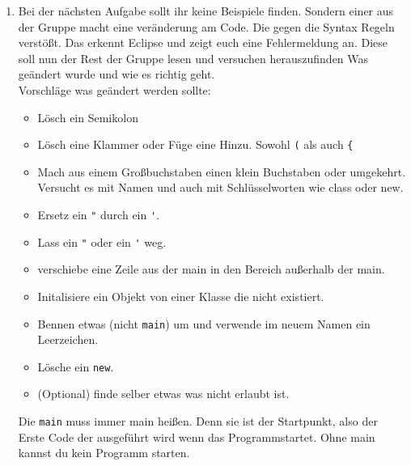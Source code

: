 \begin{enumerate}
    
    \item Bei der nächsten Aufgabe sollt ihr keine Beispiele finden. Sondern einer aus der Gruppe macht eine veränderung am Code. Die gegen die Syntax Regeln verstößt. Das erkennt Eclipse und zeigt euch eine Fehlermeldung an. Diese soll nun der Rest der Gruppe lesen und versuchen herauszufinden Was geändert wurde und wie es richtig geht.\\
          Vorschläge was geändert werden sollte:
          \begin{itemize}
              \item Lösch ein Semikolon
              \item Lösch eine Klammer oder Füge eine Hinzu. Sowohl \lstinline{(} als auch \lstinline{{}
              \item Mach aus einem Großbuchstaben einen klein Buchstaben oder umgekehrt. Versucht es mit Namen und auch mit Schlüsselworten wie class oder new.
              \item Ersetz ein \lstinline{"} durch ein \lstinline{'}.
              \item Lass ein \lstinline{"} oder ein \lstinline{'} weg.
              \item verschiebe eine Zeile aus der main in den Bereich außerhalb der main.
              \item Initalisiere ein Objekt von einer Klasse die nicht existiert.
              \item Bennen etwas (nicht \lstinline{main}) um und verwende im neuem Namen ein Leerzeichen.
              \item Lösche ein \lstinline{new}.
              \item (Optional) finde selber etwas was nicht erlaubt ist.
          \end{itemize}
          \begin{Infobox}[main]
              Die \lstinline{main} muss immer main heißen. Denn sie ist der Startpunkt, also der Erste Code der ausgeführt wird wenn das Programmstartet. Ohne main kannst du kein Programm starten.
          \end{Infobox}
\end{enumerate}
